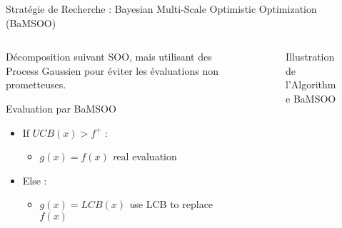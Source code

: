 \begin{frame}{Stratégie de Recherche : Bayesian Multi-Scale Optimistic Optimization (BaMSOO)}
    \begin{columns}
        
        \begin{column}{0.45\textwidth} 
            \vspace*{10pt}

            Décomposition suivant SOO, mais utilisant des Process Gaussien pour éviter les évaluations non prometteuses. 
            \begin{block}{Evaluation par BaMSOO}
                \begin{itemize}
                    \item If $UCB(x) > f^+$ :
                    \begin{itemize}
                        \item $g(x) = f(x)$ {\small \textit real evaluation}
                    \end{itemize}
                    \item Else : 
                    \begin{itemize}
                        \item $g(x) = LCB(x)$ {\small \textit use LCB to replace $f(x)$}
                    \end{itemize}
                \end{itemize}
                
            \end{block}
     
            \end{column}
                 
            \begin{column}{0.45\textwidth}
                \begin{figure}
                    \centering
                    
                    \vspace*{-10pt}\caption{Illustration de l'Algorithme BaMSOO}
                \end{figure} 
            \end{column}
                 
    \end{columns}
\end{frame}

